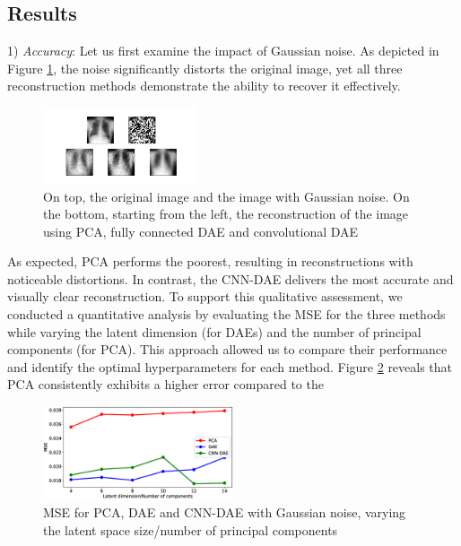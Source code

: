 \documentclass[10pt,conference,compsocconf]{IEEEtran}
\begin{document}
\subsection*{Results}
1) \textit{Accuracy}: Let us first examine the impact of Gaussian noise. As depicted in Figure \ref{fig:gaussian_lungs}, the noise significantly distorts the original image, yet all three reconstruction methods demonstrate the ability to recover it effectively.

\begin{figure}[h!]
  \centering
  \includegraphics[width=0.4\textwidth]{foto/gaussian_lungs.png}
  \caption{On top, the original image and the image with Gaussian noise. On the bottom, starting from the left, the reconstruction of the image using PCA, fully connected DAE and convolutional DAE}
  \label{fig:gaussian_lungs}
\end{figure}

As expected, PCA performs the poorest, resulting in reconstructions with noticeable distortions. In contrast, the CNN-DAE delivers the most accurate and visually clear reconstruction. To support this qualitative assessment, we conducted a quantitative analysis by 
evaluating the MSE for the three methods while varying the latent dimension (for DAEs) and the number of principal components (for PCA). This approach allowed us to compare their performance and identify the optimal hyperparameters for each method.
Figure \ref{fig:MSE_gaussian} reveals that PCA consistently exhibits a higher error 
compared to the 

\begin{figure}[h]
  \centering
  \includegraphics[width=0.5\textwidth]{foto/validation_gaussian.eps}
  \caption{MSE for PCA, DAE and CNN-DAE with Gaussian noise, varying the latent space size/number of principal components}
  \label{fig:MSE_gaussian}
\end{figure}
\end{document}
